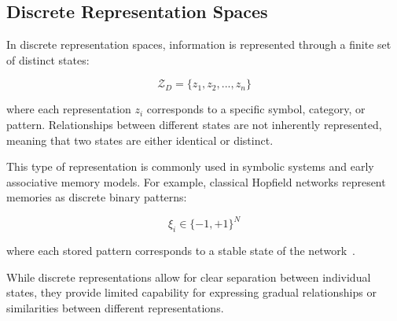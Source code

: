 \subsection{Discrete Representation Spaces}

In discrete representation spaces, information is represented through a finite set of distinct states:

\begin{equation}
    \mathcal{Z}_{D} = \{z_1, z_2, ..., z_n\}
\end{equation}

where each representation $z_i$ corresponds to a specific symbol, category, or pattern. Relationships between different states are not inherently represented, meaning that two states are either identical or distinct.

This type of representation is commonly used in symbolic systems and early associative memory models. For example, classical Hopfield networks represent memories as discrete binary patterns:

\begin{equation}
    \xi_i \in \{-1,+1\}^{N}
\end{equation}

where each stored pattern corresponds to a stable state of the network~\cite{hopfield1982}.

While discrete representations allow for clear separation between individual states, they provide limited capability for expressing gradual relationships or similarities between different representations.
